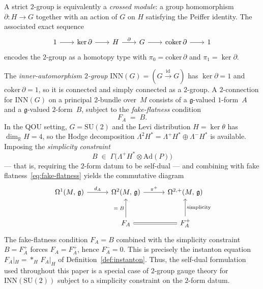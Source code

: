 \begin{remark}
\label{rem:self-dual-2group}
A strict $2$-group is equivalently a \emph{crossed module}: a
group homomorphism $\partial \colon H \to G$ together with an
action of $G$ on $H$ satisfying the Peiffer identity.  The
associated exact sequence
\begin{equation}\label{eq:crossed-module-ses}
\begin{tikzcd}[column sep=2em]
  1 \ar[r]
  & \ker\partial \ar[r]
  & H \ar[r, "\partial"]
  & G \ar[r]
  & \mathrm{coker}\,\partial \ar[r]
  & 1
\end{tikzcd}
\end{equation}
encodes the $2$-group as a homotopy type with
$\pi_0 = \mathrm{coker}\,\partial$ and
$\pi_1 = \ker\partial$.

The \emph{inner-automorphism $2$-group}
$\mathrm{INN}(G) = (G \xrightarrow{\mathrm{id}} G)$
has $\ker\partial = 1$ and $\mathrm{coker}\,\partial = 1$, so it is
connected and simply connected as a $2$-group.  A $2$-connection for
$\mathrm{INN}(G)$ on a principal $2$-bundle over~$M$ consists of a
$\mathfrak{g}$-valued $1$-form~$A$ and a $\mathfrak{g}$-valued
$2$-form~$B$, subject to the \emph{fake-flatness} condition
\begin{equation}\label{eq:fake-flatness}
F_A \;=\; B.
\end{equation}
In the QOU setting, $G = \mathrm{SU}(2)$ and the Levi distribution
$H = \ker\theta$ has $\dim_{\mathbb{R}} H = 4$, so the Hodge
decomposition $\Lambda^2 H^* = \Lambda^+\!H^* \oplus \Lambda^-\!H^*$
is available.  Imposing the \emph{simplicity constraint}
\[
  B \;\in\; \Gamma\!\bigl(\Lambda^+\!H^* \otimes \mathrm{Ad}(P)\bigr)
\]
--- that is, requiring the $2$-form datum to be self-dual ---
and combining with fake flatness~\eqref{eq:fake-flatness} yields
the commutative diagram
\begin{equation}\label{eq:2group-instanton}
\begin{tikzcd}[row sep=2.5em, column sep=3em]
  \Omega^1(M,\,\mathfrak{g})
    \ar[r, "d_A"]
  & \Omega^2(M,\,\mathfrak{g})
    \ar[r, "\pi^+"]
  & \Omega^{2,+}(M,\,\mathfrak{g})
  \\
  & F_A \ar[u, "=\;B"]
    \ar[r, equal]
  & F_A^+ \ar[u, "\text{simplicity}"']
\end{tikzcd}
\end{equation}
The fake-flatness condition $F_A = B$ combined with the simplicity
constraint $B = F_A^+$ forces $F_A = F_A^+$, hence $F_A^- = 0$.
This is precisely the instanton equation
$F_A|_H = {*_H}\,F_A|_H$
of Definition~\ref{def:instanton}.  Thus, the self-dual formulation
used throughout this paper is a special case of $2$-group gauge theory
for $\mathrm{INN}(\mathrm{SU}(2))$ subject to a simplicity constraint
on the $2$-form datum.


\end{remark}
